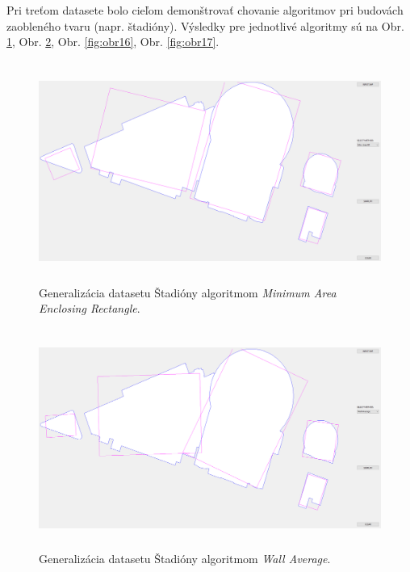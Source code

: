 \documentclass[11pt]{article}
\begin{document}
Pri treťom datasete bolo cieľom demonštrovať chovanie algoritmov pri budovách zaobleného tvaru (napr. štadióny). Výsledky pre jednotlivé algoritmy sú na Obr. \ref{fig:obr14}, Obr. \ref{fig:obr15}, Obr. \ref{fig:obr16}, Obr. \ref{fig:obr17}.

\begin{figure}[h]
\captionsetup{justification=centering}
\centering
\includegraphics[width=14.65cm, height=7.2cm]{images/stadion_maer.png}
\caption{Generalizácia datasetu Štadióny algoritmom \textit{Minimum Area Enclosing Rectangle}.}
\label{fig:obr14}
\end{figure}

\begin{figure}[h]
\captionsetup{justification=centering}
\centering
\includegraphics[width=14.65cm, height=7.2cm]{images/stadion_wa.png}
\caption{Generalizácia datasetu Štadióny algoritmom \textit{Wall Average}.}
\label{fig:obr15}
\end{figure}
\newpage
\end{document}
